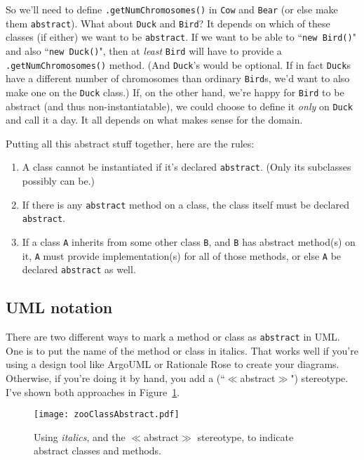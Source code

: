So we'll need to define \texttt{.getNumChromosomes()} in \texttt{Cow} and
\texttt{Bear} (or else make them \texttt{abstract}). What about \texttt{Duck}
and \texttt{Bird}? It depends on which of these classes (if either) we want to
be \texttt{abstract}. If we want to be able to ``\texttt{new Bird()}" and also
``\texttt{new Duck()}", then at \textit{least} \texttt{Bird} will have to
provide a \texttt{.getNumChromosomes()} method. (And \texttt{Duck}'s would be
optional. If in fact \texttt{Duck}s have a different number of chromosomes
than ordinary \texttt{Bird}s, we'd want to also make one on the \texttt{Duck}
class.) If, on the other hand, we're happy for \texttt{Bird} to be abstract
(and thus non-instantiatable), we could choose to define it \textit{only} on
\texttt{Duck} and call it a day. It all depends on what makes sense for the
domain.

Putting all this abstract stuff together, here are the rules:

\begin{enumerate}
\itemsep.1em
\item A class cannot be instantiated if it's declared \texttt{abstract}. (Only
its subclasses possibly can be.)
\item If there is any \texttt{abstract} method on a class, the class itself
must be declared \texttt{abstract}.
\item If a class \texttt{A} inherits from some other class \texttt{B}, and
\texttt{B} has abstract method(s) on it, \texttt{A} must provide
implementation(s) for all of those methods, or else \texttt{A} be declared 
\texttt{abstract} as well.
\end{enumerate}

\subsection{UML notation}

There are two different ways to mark a method or class as \texttt{abstract} in
UML. One is to put the name of the method or class in italics. That works well
if you're using a design tool like ArgoUML or Rationale Rose to create your
diagrams. Otherwise, if you're doing it by hand, you add a
(``$\ll$abstract$\gg$") stereotype. I've shown both approaches in
Figure~\ref{fig:zooClassAbstract}.

\begin{figure}
\centering
\texttt{[image: zooClassAbstract.pdf]}
\caption{Using \textit{italics}, and the $\ll$abstract$\gg$ stereotype, to
indicate abstract classes and methods.}
\label{fig:zooClassAbstract}
\end{figure}

